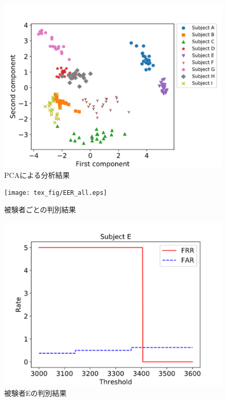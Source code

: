 \documentclass[a4j]{jarticle}%
\begin{document}
\begin{figure}[!t]
  \begin{center}
    \includegraphics[width=1\linewidth]{tex_fig/pca.eps}
  \end{center}
    \vspace{-8mm}
  \caption{PCAによる分析結果}
  \label{pca}
\end{figure}

\begin{figure}[!t]
  \begin{center}
    \texttt{[image: tex\_fig/EER\_all.eps]}
  \end{center}
    \vspace{-8mm}
  \caption{被験者ごとの判別結果}
  \label{EER_all}
\end{figure}

\begin{figure}[!t]
  \begin{center}
    \includegraphics[width=1\linewidth]{tex_fig/subject_E.eps}
  \end{center}
    \vspace{-8mm}
  \caption{被験者Eの判別結果}
  \label{subject_E}
\end{figure}
\end{document}
